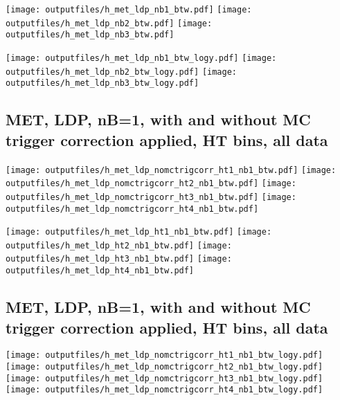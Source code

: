 \documentclass[11pt]{article}
\begin{document}
    \noindent
     \texttt{[image: outputfiles/h\_met\_ldp\_nb1\_btw.pdf]}
     \texttt{[image: outputfiles/h\_met\_ldp\_nb2\_btw.pdf]}
     \texttt{[image: outputfiles/h\_met\_ldp\_nb3\_btw.pdf]}

    \noindent
     \texttt{[image: outputfiles/h\_met\_ldp\_nb1\_btw\_logy.pdf]}
     \texttt{[image: outputfiles/h\_met\_ldp\_nb2\_btw\_logy.pdf]}
     \texttt{[image: outputfiles/h\_met\_ldp\_nb3\_btw\_logy.pdf]}


     \subsection{ MET, LDP, nB=1, with and without MC trigger correction applied, HT bins, all data}

    \noindent
     \texttt{[image: outputfiles/h\_met\_ldp\_nomctrigcorr\_ht1\_nb1\_btw.pdf]}
     \texttt{[image: outputfiles/h\_met\_ldp\_nomctrigcorr\_ht2\_nb1\_btw.pdf]}
     \texttt{[image: outputfiles/h\_met\_ldp\_nomctrigcorr\_ht3\_nb1\_btw.pdf]}
     \texttt{[image: outputfiles/h\_met\_ldp\_nomctrigcorr\_ht4\_nb1\_btw.pdf]}

    \noindent
     \texttt{[image: outputfiles/h\_met\_ldp\_ht1\_nb1\_btw.pdf]}
     \texttt{[image: outputfiles/h\_met\_ldp\_ht2\_nb1\_btw.pdf]}
     \texttt{[image: outputfiles/h\_met\_ldp\_ht3\_nb1\_btw.pdf]}
     \texttt{[image: outputfiles/h\_met\_ldp\_ht4\_nb1\_btw.pdf]}

    \clearpage
     \subsection{ MET, LDP, nB=1, with and without MC trigger correction applied, HT bins, all data}

    \noindent
     \texttt{[image: outputfiles/h\_met\_ldp\_nomctrigcorr\_ht1\_nb1\_btw\_logy.pdf]}
     \texttt{[image: outputfiles/h\_met\_ldp\_nomctrigcorr\_ht2\_nb1\_btw\_logy.pdf]}
     \texttt{[image: outputfiles/h\_met\_ldp\_nomctrigcorr\_ht3\_nb1\_btw\_logy.pdf]}
     \texttt{[image: outputfiles/h\_met\_ldp\_nomctrigcorr\_ht4\_nb1\_btw\_logy.pdf]}
\end{document}
